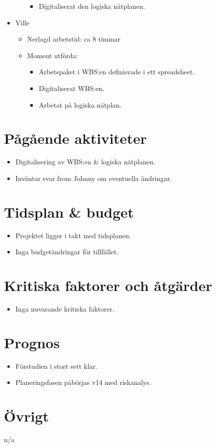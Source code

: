 \begin{itemize}[noitemsep]
\begin{itemize}[noitemsep]
\begin{itemize}[noitemsep]
            \item Digitaliserat den logiska nätplanen.
        \end{itemize}
    \end{itemize}
    \item Ville
    \begin{itemize}[noitemsep]
        \item Nerlagd arbetstid: ca 8 timmar
        \item Moment utförda:
        \begin{itemize}[noitemsep]
            \item Arbetspaket i WBS:en definierade i ett spreadsheet.
            \item Digitaliserat WBS:en.
            \item Arbetat på logiska nätplan.
        \end{itemize}
    \end{itemize}
\end{itemize}

\section{Pågående aktiviteter}
\begin{itemize}[noitemsep]
    \item Digitalisering av WBS:en \& logiska nätplanen.
    \item Inväntar svar from Johnny om eventuella ändringar.
\end{itemize}

\section{Tidsplan \& budget}
\begin{itemize}[noitemsep]
    \item Projektet ligger i takt med tidsplanen.
    \item Inga budgetändringar för tillfället.
\end{itemize}

\section{Kritiska faktorer och åtgärder}
\begin{itemize}[noitemsep]
    \item Inga nuvarande kritiska faktorer.
\end{itemize}


\section{Prognos}
\begin{itemize}[noitemsep]
    \item Förstudien i stort sett klar.
    \item Planeringsfasen påbörjas v14 med riskanalys.
\end{itemize}

\section{Övrigt}
n/a